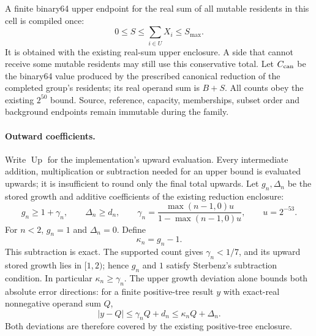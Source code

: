 \documentclass[11pt]{article}
\begin{document}
A finite binary64 upper endpoint for the real sum of all mutable residents in this cell is compiled once:
\begin{equation}
0\le S\le\sum_{i\in U}X_i\le S_{\max}.
\label{eq:uniform-mutable-total}
\end{equation}
It is obtained with the existing real-sum upper enclosure. A side that cannot receive some mutable residents may still use this conservative total. Let $C_{\rm can}$ be the binary64 value produced by the prescribed canonical reduction of the completed group's residents; its real operand sum is $B+S$. All counts obey the existing $2^{50}$ bound. Source, reference, capacity, memberships, subset order and background endpoints remain immutable during the family.

\paragraph{Outward coefficients.}
Write $\operatorname{Up}$ for the implementation's upward evaluation. Every intermediate addition, multiplication or subtraction needed for an upper bound is evaluated upwards; it is insufficient to round only the final total upwards. Let $g_n,\Delta_n$ be the stored growth and additive coefficients of the existing reduction enclosure:
\begin{equation}
g_n\ge1+\gamma_n,\qquad \Delta_n\ge d_n,\qquad
\gamma_n=\frac{\max(n-1,0)u}{1-\max(n-1,0)u},
\qquad u=2^{-53}.
\label{eq:uniform-growth}
\end{equation}
For $n<2$, $g_n=1$ and $\Delta_n=0$. Define
\begin{equation}
\kappa_n=g_n-1.
\label{eq:uniform-kappa}
\end{equation}
This subtraction is exact. The supported count gives $\gamma_n<1/7$, and its upward stored growth lies in $[1,2)$; hence $g_n$ and $1$ satisfy Sterbenz's subtraction condition. In particular $\kappa_n\ge\gamma_n$. The upper growth deviation alone bounds both absolute error directions: for a finite positive-tree result $y$ with exact-real nonnegative operand sum $Q$,
\begin{equation}
|y-Q|\le\gamma_nQ+d_n\le\kappa_nQ+\Delta_n.
\label{eq:uniform-absolute-tree}
\end{equation}
Both deviations are therefore covered by the existing positive-tree enclosure.
\end{document}
